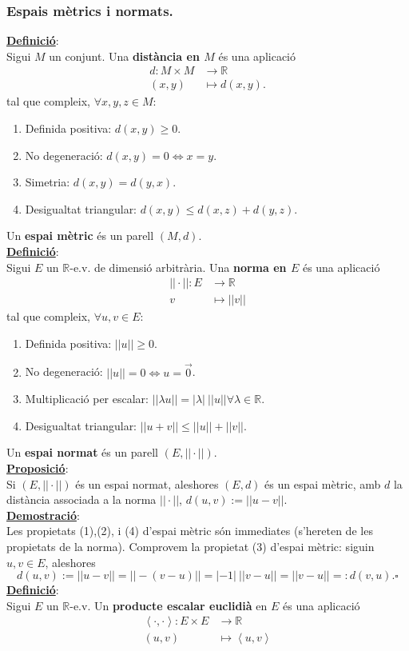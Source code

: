 \documentclass[11pt]{article}
\newcommand{\rev}{$\mathbb{R}$-e.v. }
\newcommand{\defi}{\underline{\textbf{Definició}}:\\}
\newcommand{\prop}{\underline{\textbf{Proposició}}:\\}
\newcommand{\dem}{\underline{\textbf{Demostració}}:\\}
\begin{document}
\subsubsection{Espais mètrics i normats.}
\defi Sigui $M$ un conjunt. Una \textbf{distància en $M$} és una aplicació
\begin{align*}
		d \colon M\times M &\to \mathbb{R}\\
		(x,y) &\mapsto d(x,y).
\end{align*}
tal que compleix, $\forall x,y,z\in M$:
\begin{enumerate}
	\item Definida positiva: $d(x,y)\geq0$.
	\item No degeneració: $d(x,y)=0\iff x=y$.
	\item Simetria: $d(x,y)=d(y,x)$.
	\item Desigualtat triangular: $d(x,y)\leq d(x,z)+d(y,z)$.
\end{enumerate}
Un \textbf{espai mètric} és un parell $(M,d)$.\\
\defi Sigui $E$ un \rev de dimensió arbitrària. Una \textbf{norma en $E$} és una aplicació
\begin{align*}
		||\cdot|| \colon E &\to \mathbb{R}\\
		v &\mapsto ||v||
\end{align*}
tal que compleix, $\forall u,v\in E$:
\begin{enumerate}
	\item Definida positiva: $||u||\geq0$.
	\item No degeneració: $||u||=0\iff u=\vec{0}$.
	\item Multiplicació per escalar: $||\lambda u||=|\lambda|\ ||u||\forall\lambda\in\mathbb{R}$.
	\item Desigualtat triangular: $||u+v||\leq ||u||+||v||$.
\end{enumerate}
Un \textbf{espai normat} és un parell $(E,||\cdot||)$.\\
\prop Si $(E,||\cdot||)$ és un espai normat, aleshores $(E,d)$ és un espai mètric, amb $d$ la distància associada a la norma $||\cdot||$, $d(u,v):=||u-v||$.\\
\dem Les propietats (1),(2), i (4) d'espai mètric són immediates (s'hereten de les propietats de la norma). Comprovem la propietat (3) d'espai mètric: siguin $u,v\in E$, aleshores
$$
d(u,v):=||u-v||=||-(v-u)||=|-1|\ ||v-u||=||v-u||=:d(v,u).\square
$$
\defi Sigui $E$ un \rev Un \textbf{producte escalar euclidià} en $E$ és una aplicació
\begin{align*}
		\left<\cdot,\cdot\right> \colon E\times E &\to \mathbb{R}\\
		(u,v) &\mapsto \left< u,v\right>
\end{align*}
\end{document}
